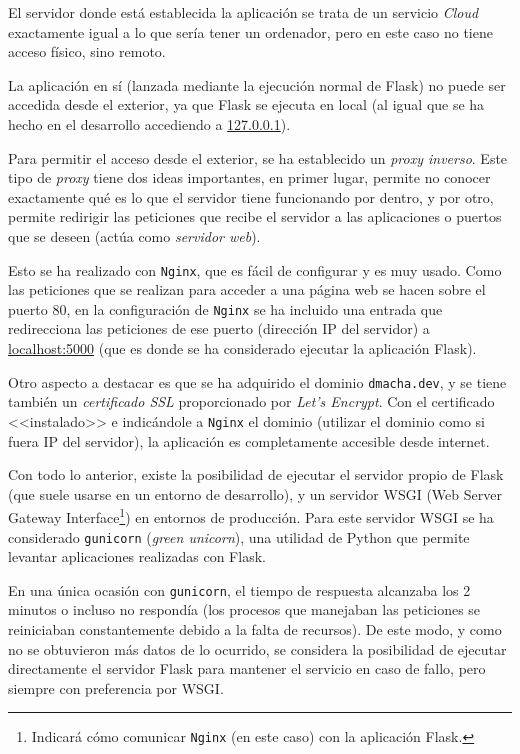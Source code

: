 El servidor donde está establecida la aplicación se trata de un servicio
\textit{Cloud} exactamente igual a lo que sería tener un ordenador, pero en este
caso no tiene acceso físico, sino remoto.

La aplicación en sí (lanzada mediante la ejecución normal de Flask) no puede ser
accedida desde el exterior, ya que Flask se ejecuta en local (al igual que se ha
hecho en el desarrollo accediendo a \url{127.0.0.1}).

Para permitir el acceso desde el exterior, se ha establecido un \emph{proxy
inverso}. Este tipo de \textit{proxy} tiene dos ideas importantes, en primer
lugar, permite no conocer exactamente qué es lo que el servidor tiene
funcionando por dentro, y por otro, permite redirigir las peticiones que recibe
el servidor a las aplicaciones o puertos que se deseen (actúa como
\emph{servidor web}).

Esto se ha realizado con \texttt{Nginx}, que es fácil de configurar y es muy
usado. Como las peticiones que se realizan para acceder a una página web se
hacen sobre el puerto 80, en la configuración de \texttt{Nginx} se ha incluido
una entrada que redirecciona las peticiones de ese puerto (dirección IP del
servidor) a \url{localhost:5000} (que es donde se ha considerado ejecutar la
aplicación Flask).

Otro aspecto a destacar es que se ha adquirido el dominio \texttt{dmacha.dev}, y
se tiene también un \emph{certificado SSL} proporcionado por \textit{Let's
Encrypt}. Con el certificado <<instalado>> e indicándole a \texttt{Nginx} el
dominio (utilizar el dominio como si fuera IP del servidor), la aplicación es
completamente accesible desde internet.

Con todo lo anterior, existe la posibilidad de ejecutar el servidor propio de
Flask (que suele usarse en un entorno de desarrollo), y un servidor WSGI (Web
Server Gateway Interface\footnote{Indicará cómo comunicar \texttt{Nginx} (en
este caso) con la aplicación Flask.}) en entornos de producción. Para este
servidor WSGI se ha considerado \texttt{gunicorn} (\textit{green unicorn}), una
utilidad de Python que permite levantar aplicaciones realizadas con Flask. 

En una única ocasión con \texttt{gunicorn}, el tiempo de respuesta alcanzaba los
2 minutos o incluso no respondía (los procesos que manejaban las peticiones se
reiniciaban constantemente debido a la falta de recursos). De este modo, y como
no se obtuvieron más datos de lo ocurrido, se considera la posibilidad de
ejecutar directamente el servidor Flask para mantener el servicio en caso de
fallo, pero siempre con preferencia por WSGI.